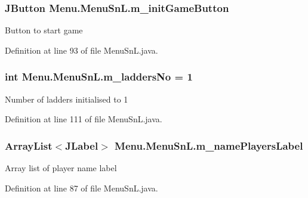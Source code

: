 \subsubsection[{m\+\_\+init\+Game\+Button}]{\setlength{\rightskip}{0pt plus 5cm}J\+Button Menu.\+Menu\+Sn\+L.\+m\+\_\+init\+Game\+Button\hspace{0.3cm}{\ttfamily [private]}}\label{class_menu_1_1_menu_sn_l_ac45af15bf2aabd1916063700e1e44f08}
Button to start game 

Definition at line 93 of file Menu\+Sn\+L.\+java.

\hypertarget{class_menu_1_1_menu_sn_l_a30c87e65118ddf61c75fa3d9d9abe36e}{}
\subsubsection[{m\+\_\+ladders\+No}]{\setlength{\rightskip}{0pt plus 5cm}int Menu.\+Menu\+Sn\+L.\+m\+\_\+ladders\+No = 1\hspace{0.3cm}{\ttfamily [private]}}\label{class_menu_1_1_menu_sn_l_a30c87e65118ddf61c75fa3d9d9abe36e}
Number of ladders initialised to 1 

Definition at line 111 of file Menu\+Sn\+L.\+java.

\hypertarget{class_menu_1_1_menu_sn_l_ab29efffc6315a328efb34fed209c0677}{}
\subsubsection[{m\+\_\+name\+Players\+Label}]{\setlength{\rightskip}{0pt plus 5cm}Array\+List$<$J\+Label$>$ Menu.\+Menu\+Sn\+L.\+m\+\_\+name\+Players\+Label\hspace{0.3cm}{\ttfamily [private]}}\label{class_menu_1_1_menu_sn_l_ab29efffc6315a328efb34fed209c0677}
Array list of player name label 

Definition at line 87 of file Menu\+Sn\+L.\+java.

\hypertarget{class_menu_1_1_menu_sn_l_afee3307aa062adfbee4edd14484c8f2c}{}
